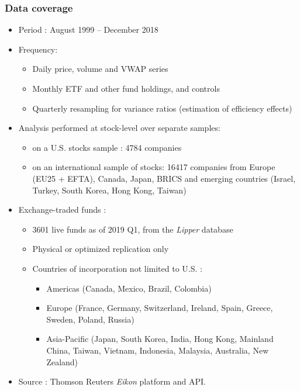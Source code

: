 \documentclass[9pt, usenames, dvipsnames]{beamer}
\begin{document}
\begin{frame}
  \frametitle{Data coverage}
  \begin{itemize}
  \item<1-> Period : August 1999 -- December 2018
  \item<2-> Frequency:
    \begin{itemize}
    \item Daily price, volume and VWAP series
    \item Monthly ETF and other fund holdings, and controls
    \item Quarterly resampling for variance ratios (estimation of efficiency effects)
    \end{itemize}
  \item<3-> Analysis performed at stock-level over separate samples:
    \begin{itemize}
    \item on a U.S. stocks sample : 4784 companies
    \item on an international sample of stocks: 16417 companies from Europe (EU25 + EFTA), Canada, Japan, BRICS and emerging countries (Israel, Turkey, South Korea, Hong Kong, Taiwan) 
    \end{itemize}
  \item<4-> Exchange-traded funds :
    \begin{itemize}
    \item 3601 live funds as of 2019 Q1, from the \textit{Lipper} database
    \item Physical or optimized replication only
    \item Countries of incorporation not limited to U.S. :
      \begin{itemize}
      \item Americas (Canada, Mexico, Brazil, Colombia)
      \item Europe (France, Germany, Switzerland, Ireland, Spain, Greece, Sweden, Poland, Russia)
      \item Asia-Pacific (Japan, South Korea, India, Hong Kong, Mainland China, Taiwan, Vietnam, Indonesia, Malaysia, Australia, New Zealand)
      \end{itemize}
    \end{itemize}
    \item<5-> Source : Thomson Reuters \emph{Eikon} platform and API. 
  \end{itemize}
  
\end{frame}
\end{document}
